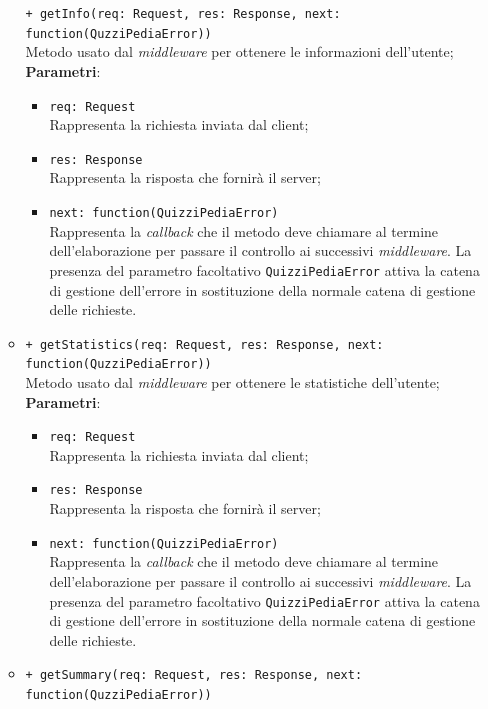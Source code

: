 \begin{itemize}
\begin{itemize}
		 \texttt{+ getInfo(req: Request, res: Response, next: function(QuzziPediaError))} \\
		Metodo usato dal \textit{middleware} per ottenere le informazioni dell'utente; \\
		\textbf{Parametri}:
		 \begin{itemize}
		  \item
			\texttt{req: Request} \\
			Rappresenta la richiesta inviata dal client;
		  \item
			\texttt{res: Response} \\
			Rappresenta la risposta che fornirà il server;
		  \item
		    \texttt{next: function(QuizziPediaError)} \\
			Rappresenta la \textit{callback} che il metodo deve chiamare al termine dell'elaborazione per passare il controllo ai successivi \textit{middleware}. La presenza del parametro facoltativo \texttt{QuizziPediaError} attiva la catena di gestione dell'errore in sostituzione della normale catena di gestione delle richieste.
		 \end{itemize}
		  \item
		 \texttt{+ getStatistics(req: Request, res: Response, next: function(QuzziPediaError))} \\
		Metodo usato dal \textit{middleware} per ottenere le statistiche dell'utente; \\
		\textbf{Parametri}:
		 \begin{itemize}
		  \item
			\texttt{req: Request} \\
			Rappresenta la richiesta inviata dal client;
		  \item
			\texttt{res: Response} \\
			Rappresenta la risposta che fornirà il server;
		  \item
		    \texttt{next: function(QuizziPediaError)} \\
			Rappresenta la \textit{callback} che il metodo deve chiamare al termine dell'elaborazione per passare il controllo ai successivi \textit{middleware}. La presenza del parametro facoltativo \texttt{QuizziPediaError} attiva la catena di gestione dell'errore in sostituzione della normale catena di gestione delle richieste.
		 \end{itemize}
		   \item
		 \texttt{+ getSummary(req: Request, res: Response, next: function(QuzziPediaError))} \\

\end{itemize}
\end{itemize}
